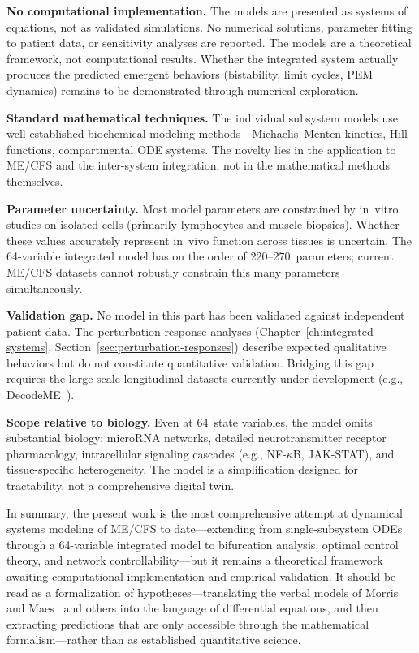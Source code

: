 \begin{limitation}
\textbf{No computational implementation.} The models are presented as systems of equations, not as validated simulations. No numerical solutions, parameter fitting to patient data, or sensitivity analyses are reported. The models are a theoretical framework, not computational results. Whether the integrated system actually produces the predicted emergent behaviors (bistability, limit cycles, PEM dynamics) remains to be demonstrated through numerical exploration.

\textbf{Standard mathematical techniques.} The individual subsystem models use well-established biochemical modeling methods---Michaelis--Menten kinetics, Hill functions, compartmental ODE systems. The novelty lies in the application to ME/CFS and the inter-system integration, not in the mathematical methods themselves.

\textbf{Parameter uncertainty.} Most model parameters are constrained by in~vitro studies on isolated cells (primarily lymphocytes and muscle biopsies). Whether these values accurately represent in~vivo function across tissues is uncertain. The 64-variable integrated model has on the order of 220--270~parameters; current ME/CFS datasets cannot robustly constrain this many parameters simultaneously.

\textbf{Validation gap.} No model in this part has been validated against independent patient data. The perturbation response analyses (Chapter~\ref{ch:integrated-systems}, Section~\ref{sec:perturbation-responses}) describe expected qualitative behaviors but do not constitute quantitative validation. Bridging this gap requires the large-scale longitudinal datasets currently under development (e.g., DecodeME~\cite{DecodeME2025}).

\textbf{Scope relative to biology.} Even at 64~state variables, the model omits substantial biology: microRNA networks, detailed neurotransmitter receptor pharmacology, intracellular signaling cascades (e.g., NF-$\kappa$B, JAK-STAT), and tissue-specific heterogeneity. The model is a simplification designed for tractability, not a comprehensive digital twin.
\end{limitation}

In summary, the present work is the most comprehensive attempt at dynamical systems modeling of ME/CFS to date---extending from single-subsystem ODEs through a 64-variable integrated model to bifurcation analysis, optimal control theory, and network controllability---but it remains a theoretical framework awaiting computational implementation and empirical validation. It should be read as a formalization of hypotheses---translating the verbal models of Morris and Maes~\cite{morris2013neuroimmune} and others into the language of differential equations, and then extracting predictions that are only accessible through the mathematical formalism---rather than as established quantitative science.

